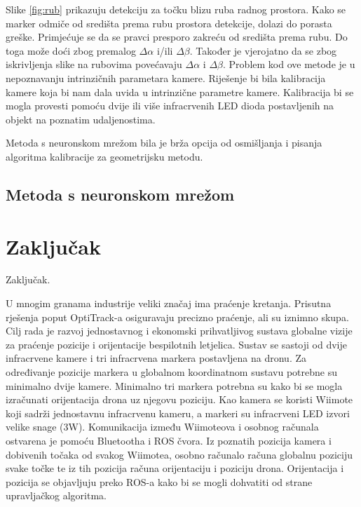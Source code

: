 \documentclass[times, utf8, diplomski]{fer}
\begin{document}
Slike \ref{fig:rub} prikazuju detekciju za točku blizu ruba radnog prostora. Kako se marker odmiče od središta prema rubu prostora detekcije, dolazi do porasta greške. Primjećuje se da se pravci presporo zakreću od središta prema rubu. Do toga može doći zbog premalog $\Delta\alpha$ i/ili $\Delta\beta$. Također je vjerojatno da se zbog iskrivljenja slike na rubovima povećavaju $\Delta\alpha$ i $\Delta\beta$. Problem kod ove metode je u nepoznavanju intrinzičnih parametara kamere. Riješenje bi bila kalibracija kamere koja bi nam dala uvida u intrinzične parametre kamere. Kalibracija bi se mogla provesti pomoću dvije ili više infracrvenih LED dioda postavljenih na objekt na poznatim udaljenostima.

Metoda s neuronskom mrežom bila je brža opcija od osmišljanja i pisanja algoritma kalibracije za geometrijsku metodu.

\section{Metoda s neuronskom mrežom}


\chapter{Zaključak}
Zaključak.




\begin{sazetak}
U mnogim granama industrije veliki značaj ima praćenje kretanja. Prisutna rješenja poput OptiTrack-a osiguravaju precizno praćenje, ali su iznimno skupa. Cilj rada je razvoj jednostavnog i ekonomski prihvatljivog sustava globalne vizije za praćenje pozicije i orijentacije bespilotnih letjelica. Sustav se sastoji od dvije infracrvene kamere i tri infracrvena markera postavljena na dronu. Za određivanje pozicije markera u globalnom koordinatnom sustavu potrebne su minimalno dvije kamere. Minimalno tri markera potrebna su kako bi se mogla izračunati orijentacija drona uz njegovu poziciju. Kao kamera se koristi Wiimote koji sadrži jednostavnu infracrvenu kameru, a markeri su infracrveni LED izvori velike snage (3W). Komunikacija između Wiimoteova i osobnog računala ostvarena je pomoću Bluetootha i ROS čvora. Iz poznatih pozicija kamera i dobivenih točaka od svakog Wiimotea, osobno računalo računa globalnu poziciju svake točke te iz tih pozicija računa orijentaciju i poziciju drona. Orijentacija i pozicija se objavljuju preko ROS-a kako bi se mogli dohvatiti od strane upravljačkog algoritma. 

\end{sazetak}
\newpage
\end{document}
